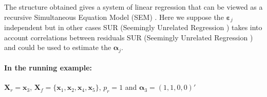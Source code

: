 \documentclass[11pt,a4paper]{report}
\begin{document}
The structure obtained gives a system of linear regression that can be viewed as a recursive Simultaneous Equation Model (\textsc{SEM})\cite{davidson1993estimation} \cite{TIMM}.
  	Here we suppose the $\boldsymbol{\varepsilon}_j$ independent but in other cases \textsc{SUR} (Seemingly Unrelated Regression \cite{SURzellner}) takes into account correlations between residuals \textsc{SUR} (Seemingly Unrelated Regression \cite{SURzellner}) and could be used to estimate the $\boldsymbol{\alpha}_j$. 
		 
	 
\paragraph{In the running example:}$\boldsymbol{X}_r=\boldsymbol{x}_3$, $\boldsymbol{X}_f=\{\boldsymbol{x}_1,\boldsymbol{x}_2,\boldsymbol{x}_4,\boldsymbol{x}_5 \}$, $p_r=1$ and $\boldsymbol{\alpha}_3=(1,1,0,0)'$

	
\end{document}
